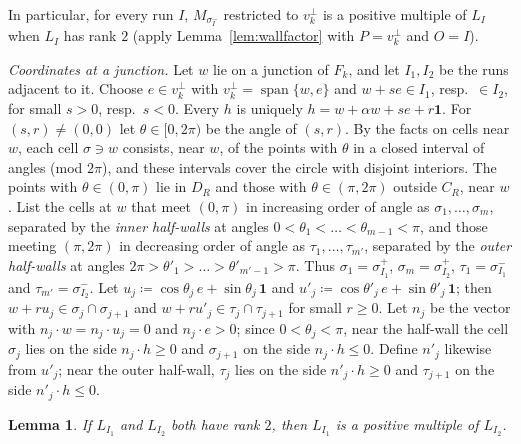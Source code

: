 \documentclass[11pt]{article}
\newcommand{\one}{\mathbf{1}}
\DeclareMathOperator{\spn}{span}
\theoremstyle{plain}
\newtheorem{lemma}[theorem]{Lemma}
\theoremstyle{definition}
\theoremstyle{remark}
\begin{document}
In particular, for every run $I$, $M_{\sigma^-_I}$ restricted to $v_k^\perp$ is a positive
multiple of $L_I$ when $L_I$ has rank $2$ (apply Lemma~\ref{lem:wallfactor} with $P=
v_k^\perp$ and $O=I$).

\emph{Coordinates at a junction.} Let $w$ lie on a junction of $F_k$, and let $I_1,I_2$
be the runs adjacent to it. Choose $e\in v_k^\perp$ with $v_k^\perp=\spn\{w,e\}$ and
$w+se\in I_1$, resp.\ $\in I_2$, for small $s>0$, resp.\ $s<0$. Every $h$ is uniquely
$h=w+\alpha w+se+r\one$. For $(s,r)\ne(0,0)$ let $\theta\in[0,2\pi)$ be the angle of
$(s,r)$. By the facts on cells near $w$, each cell $\sigma\ni w$ consists, near $w$, of the
points with $\theta$ in a closed interval of angles (mod $2\pi$), and these intervals
cover the circle with disjoint interiors. The points with $\theta\in(0,\pi)$ lie in $D_R$
and those with $\theta\in(\pi,2\pi)$ outside $C_R$, near $w$. List the cells at $w$ that
meet $(0,\pi)$ in increasing order of angle as $\sigma_1,\dots,\sigma_m$, separated by the
\emph{inner half-walls} at angles $0<\theta_1<\dots<\theta_{m-1}<\pi$, and those meeting
$(\pi,2\pi)$ in decreasing order of angle as $\tau_1,\dots,\tau_{m'}$, separated by the
\emph{outer half-walls} at angles $2\pi>\theta'_1>\dots>\theta'_{m'-1}>\pi$. Thus
$\sigma_1=\sigma^+_{I_1}$, $\sigma_m=\sigma^+_{I_2}$, $\tau_1=\sigma^-_{I_1}$ and
$\tau_{m'}=\sigma^-_{I_2}$. Let $u_j\coloneqq\cos\theta_j\,e+\sin\theta_j\,\one$ and
$u'_j\coloneqq\cos\theta'_j\,e+\sin\theta'_j\,\one$; then $w+ru_j\in\sigma_j\cap
\sigma_{j+1}$ and $w+ru'_j\in\tau_j\cap\tau_{j+1}$ for small $r\ge0$. Let $n_j$ be the
vector with $n_j\cdot w=n_j\cdot u_j=0$ and $n_j\cdot e>0$; since $0<\theta_j<\pi$, near
the half-wall the cell $\sigma_j$ lies on the side $n_j\cdot h\ge0$ and $\sigma_{j+1}$ on
the side $n_j\cdot h\le0$. Define $n'_j$ likewise from $u'_j$; near the outer half-wall,
$\tau_j$ lies on the side $n'_j\cdot h\ge0$ and $\tau_{j+1}$ on the side $n'_j\cdot
h\le0$.

\begin{lemma}\label{lem:ranktwo}
If $L_{I_1}$ and $L_{I_2}$ both have rank $2$, then $L_{I_1}$ is a positive multiple of
$L_{I_2}$.
\end{lemma}
\end{document}
